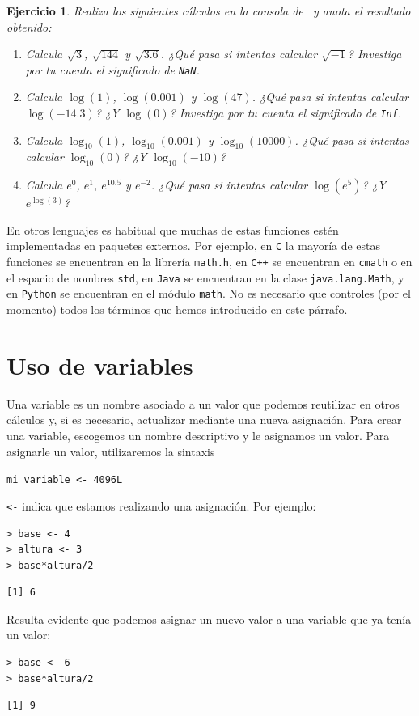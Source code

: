 \documentclass[11pt,a4paper]{article}
\newcommand{\R}{\textcolor{azuluc}{\faIcon{r-project}}}
\theoremstyle{exercise}
\newtheorem{exercise}{Ejercicio}
\begin{document}
\begin{exercise} Realiza los siguientes cálculos en la consola de \R\ y anota el resultado obtenido:
\begin{enumerate}
\item Calcula $\sqrt{3}$, $\sqrt{144}$ y $\sqrt{3.6}$. ¿Qué pasa si intentas calcular $\sqrt{-1}$? Investiga por tu cuenta el significado de \texttt{NaN}.
\item Calcula $\log(1)$, $\log(0.001)$ y $\log(47)$. ¿Qué pasa si intentas calcular $\log(-14.3)$? ¿Y $\log(0)$? Investiga por tu cuenta el significado de \texttt{Inf}.
\item Calcula $\log_{10}(1)$, $\log_{10}(0.001)$ y $\log_{10}(10000)$. ¿Qué pasa si intentas calcular $\log_{10}(0)$? ¿Y $\log_{10}(-10)$?
\item Calcula $e^0$, $e^1$, $e^{10.5}$ y $e^{-2}$. ¿Qué pasa si intentas calcular $\log(e^5)$? ¿Y $e^{\log(3)}$?
\end{enumerate}
\end{exercise}

En otros lenguajes es habitual que muchas de estas funciones estén implementadas en paquetes externos. Por ejemplo, en \texttt{C} la mayoría de estas funciones se encuentran en la librería \texttt{math.h}, en \texttt{C++} se encuentran en \texttt{cmath} o en el espacio de nombres \texttt{std}, en \texttt{Java} se encuentran en la clase \texttt{java.lang.Math}, y en \texttt{Python} se encuentran en el módulo \texttt{math}. No es necesario que controles (por el momento) todos los términos que hemos introducido en este párrafo.


\section{Uso de variables}


Una variable es un nombre asociado a un valor que podemos reutilizar en otros cálculos y, si es necesario, actualizar mediante una nueva asignación. Para crear una variable, escogemos un nombre descriptivo y le asignamos un valor. Para asignarle un valor, utilizaremos la sintaxis
\begin{center}
    \texttt{mi\_variable <- 4096L}
\end{center}

\noindent \texttt{<-} indica que estamos realizando una asignación. Por ejemplo:
\begin{lstlisting}[style=rconsole]
> base <- 4
> altura <- 3
> base*altura/2
\end{lstlisting}
\begin{lstlisting}[style=routput]
[1] 6
\end{lstlisting}
Resulta evidente que podemos asignar un nuevo valor a una variable que ya tenía un valor:
\begin{lstlisting}[style=rconsole]
> base <- 6
> base*altura/2
\end{lstlisting}
\begin{lstlisting}[style=routput]
[1] 9
\end{lstlisting}
\end{document}
